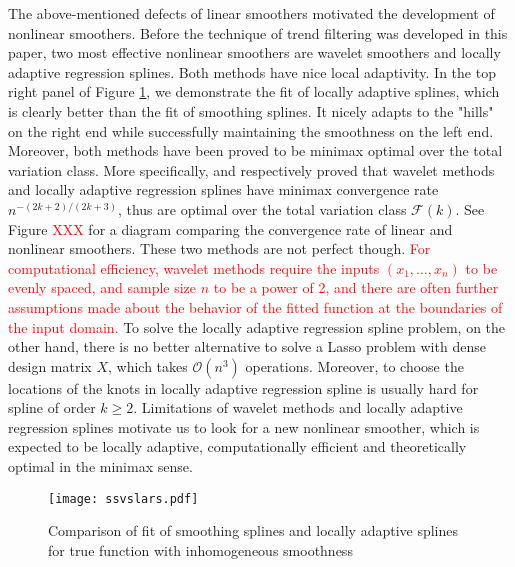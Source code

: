 \documentclass[a4paper]{article}
\renewcommand{\cal}{\mathcal}
\begin{document}
The above-mentioned defects of linear smoothers motivated the development of nonlinear smoothers. Before the technique of trend filtering was developed in this paper, two most effective nonlinear smoothers are wavelet smoothers\cite{johnstone2011gaussian,mallat2008wavelet,donoho1994ideal} and locally adaptive regression splines\cite{mammen1997locally}. Both methods have nice local adaptivity. In the top right panel of Figure \ref{fig:ssvslars}, we demonstrate the fit of locally adaptive splines, which is clearly better than the fit of smoothing splines. It nicely adapts to the "hills" on the right end while successfully maintaining the smoothness on the left end. Moreover, both methods have been proved to be minimax optimal over the total variation class. More specifically, \cite{donoho1998minimax} and \cite{mammen1997locally} respectively proved that wavelet methods and locally adaptive regression splines have minimax convergence rate $n^{-(2k+2)/(2k+3)}$, thus are optimal over the total variation class $\cal{F}(k)$. See Figure \textcolor{red}{XXX} for a diagram comparing the convergence rate of linear and nonlinear smoothers. These two methods are not perfect though. \textcolor{red}{For computational efficiency, wavelet methods require the inputs $(x_1,\ldots, x_n)$ to be evenly spaced, and sample size $n$ to be a power of 2, and there are often further assumptions made about the behavior of the fitted function at the boundaries of the input domain.} To solve the locally adaptive regression spline problem, on the other hand, there is no better alternative to solve a Lasso problem with dense design matrix $X$, which takes $\cal{O}(n^3)$ operations. Moreover, to choose the locations of the knots in locally adaptive regression spline is usually hard for spline of order $k\geq 2$. Limitations of wavelet methods and locally adaptive regression splines motivate us to look for a new nonlinear smoother, which is expected to be locally adaptive, computationally efficient and theoretically optimal in the minimax sense.

\begin{figure}[t!]
\centering
\texttt{[image: ssvslars.pdf]}
\caption{Comparison of fit of smoothing splines and locally adaptive splines for true function with inhomogeneous smoothness}
\label{fig:ssvslars}
\end{figure}
\end{document}
